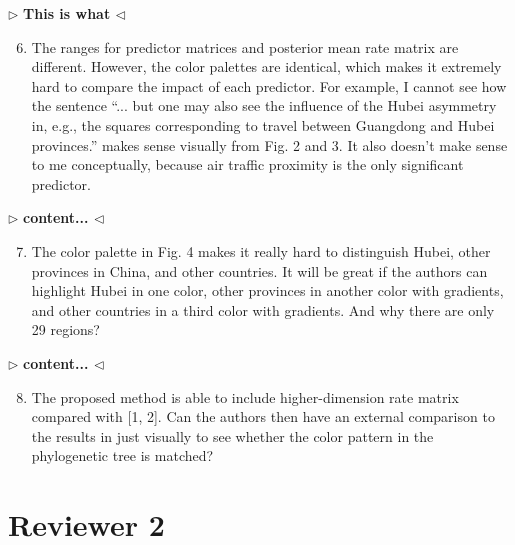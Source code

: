 \documentclass[12pt]{article}
\newenvironment{reply}{$\triangleright$\bfseries}{$\triangleleft$}
\begin{document}
\begin{reply}
This is what 
\end{reply}

\begin{enumerate}	
\setcounter{enumi}{5}	
	\item The ranges for predictor matrices and posterior mean rate matrix are different. However, the color palettes are identical, which makes it extremely hard to compare the impact of each predictor. For example, I cannot see how the sentence “... but one may also see the influence of the Hubei asymmetry in, e.g., the squares corresponding to travel between Guangdong and Hubei provinces.” makes sense visually from Fig. 2 and 3. It also doesn’t make sense to me conceptually, because air traffic proximity is the only significant predictor.
\end{enumerate}




\begin{reply}
content...
\end{reply}

\begin{enumerate}	
\setcounter{enumi}{6}	
	\item 
	The color palette in Fig. 4 makes it really hard to distinguish Hubei, other provinces in China, and other countries. It will be great if the authors can highlight Hubei in one color, other provinces in another color with gradients, and other countries in a third color with gradients. And why there are only 29 regions?
\end{enumerate}

\begin{reply}
content...
\end{reply}

\begin{enumerate}	
\setcounter{enumi}{7}	
	\item 
	The proposed method is able to include higher-dimension rate matrix compared with \citet{lemey2009bayesian,lemey2014unifying} [1, 2]. Can the authors then have an external comparison to the results in \citet{lemey2020accommodating} just visually to see whether the color pattern in the phylogenetic tree is matched?
\end{enumerate}



\section*{Reviewer 2}
\end{document}
